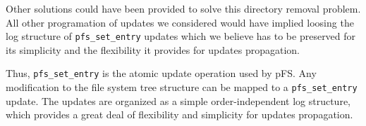 Other solutions could have been provided to solve this directory
removal problem. All other programation of updates we considered would
have implied loosing the log structure of {\tt pfs\_set\_entry}
updates which we believe has to be preserved for its simplicity and
the flexibility it provides for updates propagation.

Thus, {\tt pfs\_set\_entry} is the atomic update operation used by
pFS. Any modification to the file system tree structure can be mapped
to a {\tt pfs\_set\_entry} update. The updates are organized as a
simple order-independent log structure, which provides a great deal of
flexibility and simplicity for updates propagation.

